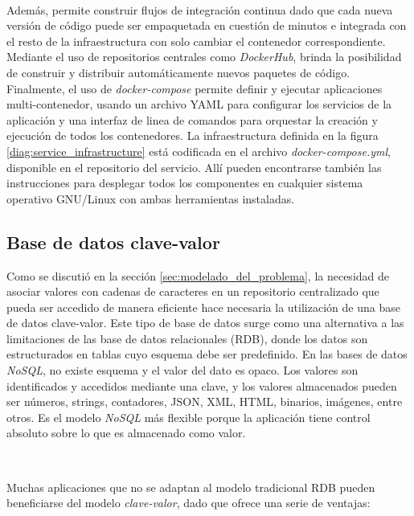 \documentclass[a4paper,12pt, oneside]{article}
\begin{document}
\

Además, permite construir flujos de integración continua dado que cada nueva versión de código puede ser empaquetada en cuestión de minutos e integrada con el resto de la infraestructura con solo cambiar el contenedor correspondiente. Mediante el uso de repositorios centrales como \textit{DockerHub}, brinda la posibilidad de construir y distribuir automáticamente nuevos paquetes de código.
Finalmente, el uso de \textit{docker-compose} permite definir y ejecutar aplicaciones multi-contenedor, usando un archivo YAML para configurar los servicios de la aplicación y una interfaz de linea de comandos para orquestar la creación y ejecución de todos los contenedores. La infraestructura definida en la figura \ref{diag:service_infrastructure} está codificada en el archivo \textit{docker-compose.yml}, disponible en el repositorio del servicio\cite{sketch-service}. Allí pueden encontrarse también las instrucciones para desplegar todos los componentes en cualquier sistema operativo GNU/Linux con ambas herramientas instaladas.


\subsection{Base de datos clave-valor}
Como se discutió en la sección \ref{sec:modelado_del_problema}, la necesidad de asociar valores con cadenas de caracteres en un repositorio centralizado que pueda ser accedido de manera eficiente hace necesaria la utilización de una base de datos clave-valor.
Este tipo de base de datos surge como una alternativa a las limitaciones de las base de datos relacionales (RDB), donde los datos son estructurados en tablas cuyo esquema debe ser predefinido. En las bases de datos \textit{NoSQL}, no existe esquema y el valor del dato es opaco. Los valores son identificados y accedidos mediante una clave, y los valores almacenados pueden ser números, strings, contadores, JSON, XML, HTML, binarios, imágenes, entre otros. Es el modelo \textit{NoSQL} más flexible porque la aplicación tiene control absoluto sobre lo que es almacenado como valor.

\

Muchas aplicaciones que no se adaptan al modelo tradicional RDB pueden beneficiarse del modelo \textit{clave-valor}, dado que ofrece una serie de ventajas:
\end{document}
